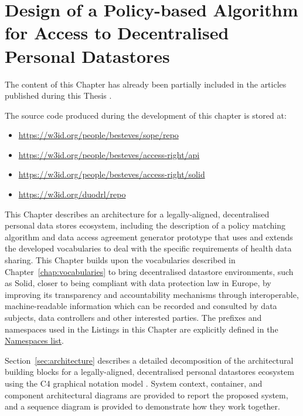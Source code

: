 \chapter{Design of a Policy-based Algorithm for Access to Decentralised Personal Datastores}
\label{chap:matching}

\begin{tcolorbox}[colback=royallavender!40]
The content of this Chapter has already been partially included in the articles published during this Thesis \citep{esteves_odrl_2021,esteves_using_2022,pandit_enhancing_2024,esteves_automating_2022}.
\end{tcolorbox}

\begin{tcolorbox}[colback=royallavender!10]
The source code produced during the development of this chapter is stored at:
\begin{itemize}
    \item \url{https://w3id.org/people/besteves/sope/repo}
    \item \url{https://w3id.org/people/besteves/access-right/api}
    \item \url{https://w3id.org/people/besteves/access-right/solid}
    \item \url{https://w3id.org/duodrl/repo}
\end{itemize}
\end{tcolorbox}

This Chapter describes an architecture for a legally-aligned, decentralised personal data stores ecosystem, including the description of a policy matching algorithm and data access agreement generator prototype that uses and extends the developed vocabularies to deal with the specific requirements of health data sharing.
This Chapter builds upon the vocabularies described in Chapter~\ref{chap:vocabularies} to bring decentralised datastore environments, such as Solid, closer to being compliant with data protection law in Europe, by improving its transparency and accountability mechanisms through interoperable, machine-readable information which can be recorded and consulted by data subjects, data controllers and other interested parties.
The prefixes and namespaces used in the Listings in this Chapter are explicitly defined in the \hyperref[sec:namespaces]{Namespaces list}.

Section~\ref{sec:architecture} describes a detailed decomposition of the architectural building blocks for a legally-aligned, decentralised personal datastores ecosystem using the C4 graphical notation model \citep{brown_c4_2015}.
System context, container, and component architectural diagrams are provided to report the proposed system, and a sequence diagram is provided to demonstrate how they work together.


